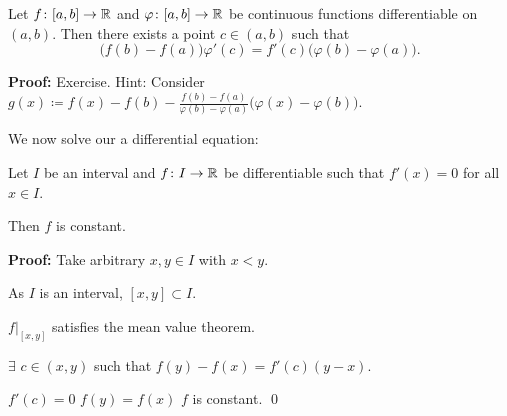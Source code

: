 \documentclass[10pt,aspectratio=169]{beamer}
\begin{document}
\begin{frame}
\begin{theorem}
Let $f \colon [a,b] \to {\mathbb{R}}$ and $\varphi \colon [a,b] \to {\mathbb{R}}$ be continuous
functions
differentiable on $(a,b)$.  Then there exists a point $c \in (a,b)$
such that
\begin{equation*}
\bigl(f(b)-f(a)\bigr)\varphi'(c) = f'(c)\bigl(\varphi(b)-\varphi(a)\bigr) .
\end{equation*}
\end{theorem}

\pause
\textbf{Proof:} Exercise.
\pause
Hint: Consider
$g(x) \coloneqq
f(x)-f(b)-\frac{f(b)-f(a)}{\varphi(b)-\varphi(a)}\bigl(\varphi(x)-\varphi(b)\bigr)$.

\end{frame}

\begin{frame}

We now solve our a differential equation:

\begin{proposition}
Let $I$ be an interval and
$f \colon I \to {\mathbb{R}}$ be differentiable such that $f'(x) = 0$
for all $x \in I$.

\pause
Then $f$ is constant.
\end{proposition}

\pause
\textbf{Proof:}
Take arbitrary $x,y \in I$ with $x < y$.

\pause
\medskip

As $I$ is an interval, $[x,y] \subset I$.

\pause
\medskip

$f|_{[x,y]}$ satisfies the mean value theorem.

\pause
\medskip

\thus \quad $\exists$ $c \in (x,y)$ such that
$\displaystyle f(y)-f(x) = f'(c)(y-x)$.

\pause
\medskip

$f'(c) = 0$
\pause
\wthus $f(y) = f(x)$
\pause
\wthus $f$ is constant.
\qed
\end{frame}
\end{document}
